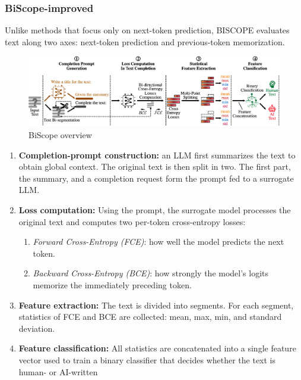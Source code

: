 \subsubsection{BiScope-improved}
Unlike methods that focus only on next-token prediction, 
BISCOPE evaluates text along two axes: next-token prediction 
and previous-token memorization.

\begin{figure}[H]
    \centering
    \includegraphics[width=1\textwidth]{img/BiScope/Overview.png}
    \caption{BiScope overview}
    \label{fig:BiScope-overview}
\end{figure}

\begin{enumerate}
    \item \textbf{Completion-prompt construction:} an LLM first summarizes the 
    text to obtain global context. The original text is then split in two. 
    The first part, the summary, and a completion request form the prompt fed 
    to a surrogate LLM.
    \item \textbf{Loss computation:} Using the prompt, the surrogate model processes 
    the original text and computes two per-token cross-entropy losses:
    \begin{enumerate}
        \item \textit{Forward Cross-Entropy (FCE)}: how well the model predicts the next token.
        \item \textit{Backward Cross-Entropy (BCE)}: how strongly the model’s logits memorize the immediately preceding token.
    \end{enumerate}
    \item \textbf{Feature extraction:} The text is divided into segments. 
    For each segment, statistics of FCE and BCE are 
    collected: mean, max, min, and standard deviation.

    \item \textbf{Feature classification:} All statistics are concatenated into a 
    single feature vector used to train a binary classifier that decides 
    whether the text is human- or AI-written
\end{enumerate}




